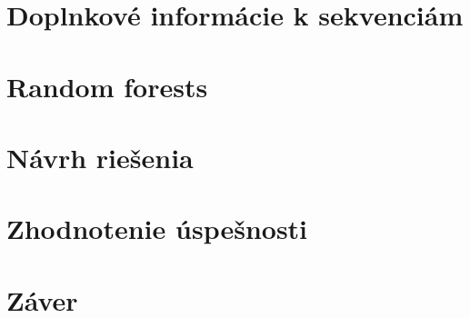 


\chapter{Doplnkové informácie k sekvenciám}
\chapter{Random forests}
\chapter{Návrh riešenia}

\chapter{Zhodnotenie úspešnosti}
\chapter*{Záver}
